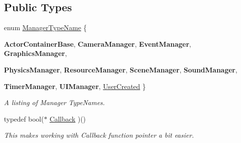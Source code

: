 \subsection*{Public Types}
\begin{DoxyCompactItemize}
\item 
enum \hyperlink{classphys_1_1ManagerBase_aaa6ccddf23892eaccb898529414f80a5}{ManagerTypeName} \{ \par
{\bfseries ActorContainerBase}, 
{\bfseries CameraManager}, 
{\bfseries EventManager}, 
{\bfseries GraphicsManager}, 
\par
{\bfseries PhysicsManager}, 
{\bfseries ResourceManager}, 
{\bfseries SceneManager}, 
{\bfseries SoundManager}, 
\par
{\bfseries TimerManager}, 
{\bfseries UIManager}, 
\hyperlink{classphys_1_1ManagerBase_aaa6ccddf23892eaccb898529414f80a5a3239296e554feede76c4bcb6f824c66c}{UserCreated}
 \}
\begin{DoxyCompactList}\small\item\em A listing of Manager TypeNames. \item\end{DoxyCompactList}\item 
\hypertarget{classphys_1_1ManagerBase_a753f5f0127131529767beab2502f480b}{
typedef bool($\ast$ \hyperlink{classphys_1_1ManagerBase_a753f5f0127131529767beab2502f480b}{Callback} )()}
\label{d2/de3/classphys_1_1ManagerBase_a753f5f0127131529767beab2502f480b}

\begin{DoxyCompactList}\small\item\em This makes working with Callback function pointer a bit easier. \item\end{DoxyCompactList}\end{DoxyCompactItemize}
